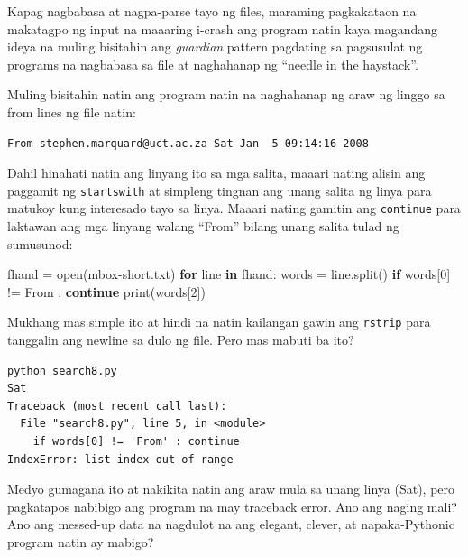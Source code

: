 \documentclass[10pt,]{book}
\newenvironment{Shaded}{}{}
\newcommand{\BuiltInTok}[1]{\textcolor[rgb]{0.00,0.50,0.00}{#1}}
\newcommand{\ControlFlowTok}[1]{\textcolor[rgb]{0.00,0.44,0.13}{\textbf{#1}}}
\newcommand{\DecValTok}[1]{\textcolor[rgb]{0.25,0.63,0.44}{#1}}
\newcommand{\KeywordTok}[1]{\textcolor[rgb]{0.00,0.44,0.13}{\textbf{#1}}}
\newcommand{\NormalTok}[1]{#1}
\newcommand{\OperatorTok}[1]{\textcolor[rgb]{0.40,0.40,0.40}{#1}}
\newcommand{\StringTok}[1]{\textcolor[rgb]{0.25,0.44,0.63}{#1}}
\begin{document}
\begin{enumerate}
  Kapag nagbabasa at nagpa-parse tayo ng files, maraming pagkakataon na
  makatagpo ng input na maaaring i-crash ang program natin kaya
  magandang ideya na muling bisitahin ang \emph{guardian} pattern
  pagdating sa pagsusulat ng programs na nagbabasa sa file at naghahanap
  ng ``needle in the haystack''.

  Muling bisitahin natin ang program natin na naghahanap ng araw ng
  linggo sa from lines ng file natin:

{\small
\begin{verbatim}
From stephen.marquard@uct.ac.za Sat Jan  5 09:14:16 2008
\end{verbatim}
}

  Dahil hinahati natin ang linyang ito sa mga salita, maaari nating
  alisin ang paggamit ng \texttt{startswith} at simpleng tingnan ang
  unang salita ng linya para matukoy kung interesado tayo sa linya.
  Maaari nating gamitin ang \texttt{continue} para laktawan ang mga
  linyang walang ``From'' bilang unang salita tulad ng sumusunod:

\begin{Shaded}
\begin{Highlighting}[]
\NormalTok{fhand }\OperatorTok{=} \BuiltInTok{open}\NormalTok{(}\StringTok{\textquotesingle{}mbox{-}short.txt\textquotesingle{}}\NormalTok{)}
\ControlFlowTok{for}\NormalTok{ line }\KeywordTok{in}\NormalTok{ fhand:}
\NormalTok{    words }\OperatorTok{=}\NormalTok{ line.split()}
    \ControlFlowTok{if}\NormalTok{ words[}\DecValTok{0}\NormalTok{] }\OperatorTok{!=} \StringTok{\textquotesingle{}From\textquotesingle{}}\NormalTok{ : }\ControlFlowTok{continue}
    \BuiltInTok{print}\NormalTok{(words[}\DecValTok{2}\NormalTok{])}
\end{Highlighting}
\end{Shaded}

  Mukhang mas simple ito at hindi na natin kailangan gawin ang
  \texttt{rstrip} para tanggalin ang newline sa dulo ng file. Pero mas
  mabuti ba ito?

{\small
\begin{verbatim}
python search8.py
Sat
Traceback (most recent call last):
  File "search8.py", line 5, in <module>
    if words[0] != 'From' : continue
IndexError: list index out of range
\end{verbatim}
}

  Medyo gumagana ito at nakikita natin ang araw mula sa unang linya
  (Sat), pero pagkatapos nabibigo ang program na may traceback error.
  Ano ang naging mali? Ano ang messed-up data na nagdulot na ang
  elegant, clever, at napaka-Pythonic program natin ay mabigo?


\end{enumerate}
\end{document}
